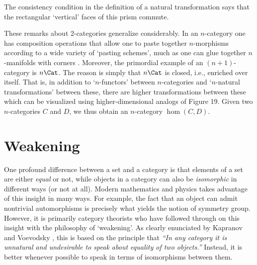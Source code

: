 \noindent The consistency condition in the definition of a
natural transformation says that the rectangular `vertical' faces
of this prism commute.

These remarks about 2-categories generalize considerably.   In an
$n$-category one has composition operations that allow one to
paste together $n$-morphisms according to a wide variety of
`pasting schemes', much as one can glue together $n$-manifolds
with corners \cite{Johnson}.  Moreover, the primordial example of
an $(n+1)$-category is $n\Cat$.  The reason is simply that
$n\Cat$ is closed, i.e., enriched over itself.    That is, in
addition to `$n$-functors' between $n$-categories and
`$n$-natural transformations' between these, there are higher
transformations between these which can be visualized using
higher-dimensional analogs of Figure 19.  Given two
$n$-categories $C$ and $D$, we thus obtain an $n$-category $\hom(C,D)$.

\section{Weakening}

One
profound difference between a set and a category is that elements
of a set are either {\it equal} or not, while objects
in a category can also be {\it isomorphic} in different ways (or
not at all).   Modern mathematics and physics takes advantage of
this insight in many ways.  For example, the fact that an object can
admit nontrivial automorphisms is precisely what yields the
notion of symmetry group.   However, it is primarily
category theorists who have followed through on this insight with
the philosophy of `weakening'.  As clearly enunciated
by Kapranov and Voevodsky \cite{KV}, this is based on
the principle that {\it ``In any
category it is unnatural and undesirable to speak about equality of
two objects.''}   Instead, it is better whenever possible to
speak in terms of isomorphisms between them.

